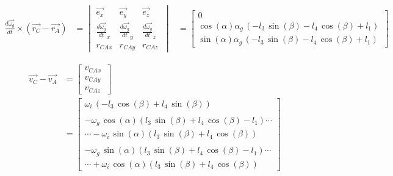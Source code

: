 \begin{equation*}
\begin{split}
\frac{d\overrightarrow{\omega_{g}}}{dt}\times(\overrightarrow{r_{C}}-\overrightarrow{r_{A}})
&=	\begin{vmatrix}
	\overrightarrow{e_{x}} & \overrightarrow{e_{y}} & \overrightarrow{e_{z}}\\
	\frac{d\overrightarrow{\omega_g}}{dt}_{x} & \frac{d\overrightarrow{\omega_g}}{dt}_{y} & \frac{d\overrightarrow{\omega_g}}{dt}_{z}\\
	r_{CAx} & r_{CAy} & r_{CAz}\
	\end{vmatrix}
&=	\begin{bmatrix}
	0\\
	\cos \left( \alpha\right) \alpha_{g}\, \left( -l_{3}\,\sin \left( \beta \right) -l_{4}\,\cos \left( \beta \right) +l_{1} \right) \\
	\sin\left( \alpha \right) \alpha_{g}\, \left( -l_{3}\,\sin \left( \beta\right) -l_{4}\,\cos \left( \beta \right) +l_{1} \right)\
	\end{bmatrix}
\end{split}
\end{equation*}

\begin{equation*}
\begin{split}
\overrightarrow{v_{C}}-\overrightarrow{v_{A}}
&=	\begin{bmatrix}
	v_{CAx}\\
	v_{CAy}\\
	v_{CAz}\
	\end{bmatrix}\\
&=	\begin{bmatrix}
	\omega_{i}\, \left( -l_{3}\,\cos \left( \beta \right) +l_{4}\,\sin \left( \beta \right)  \right) \\
	\\
	-\omega_{g}\,\cos \left( \alpha \right)  \left( l_{3}\,\sin \left( \beta \right) +l_{4}\,\cos \left( \beta \right) -l_{1} \right)\cdots\\
	\cdots -\omega_{i}\,\sin \left( \alpha \right)  \left( l_{3}\,\sin\left( \beta \right) +l_{4}\,\cos \left( \beta \right)  \right) \\
	\\
	-\omega_{g}\,\sin \left( \alpha \right)  \left( l_{3}\,\sin \left( \beta \right) +l_{4}\,\cos \left( \beta \right) -l_{1} \right)\cdots\\
	\cdots +\omega_{i}\,\cos \left( \alpha \right)  \left( l_{3}\,\sin\left( \beta \right) +l_{4}\,\cos \left( \beta \right)  \right)\
	\end{bmatrix}
\end{split}
\end{equation*}

